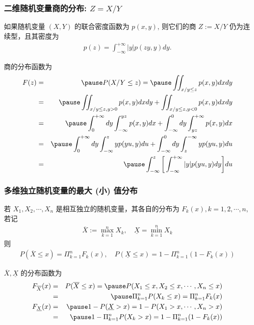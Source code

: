  \begin{frame}
 	\frametitle{二维随机变量商的分布: $Z=X/Y$}
 	\vspace{-0.3cm}
 	\begin{thm}[商的密度] 如果随机变量 $(X,Y)$ 的联合密度函数为 $p (x,y)$, 则它们的商 $Z:=X/Y$ 仍为连续型，且其密度为
 		\begin{eqnarray*}
 			p(z)=\int_{-\infty}^{+\infty} |y|p(zy,y)dy.
 		\end{eqnarray*}
 	\end{thm}
 	\pause \zheng 商的分布函数为
 	\vspace{-0.3cm}
 	\begin{eqnarray*}
 		F(z)&=&\pause P(X/Y\le z)=\pause \iint_{x/y\le z}p(x,y)dxdy\\
 		&=&\pause \iint_{x/y\le z, y>0}p(x,y)dxdy+\iint_{x/y\le z,y<0}p(x,y)dxdy\\
 		&=&\pause \int_0^{+\infty} dy\int_{-\infty}^{yz}p(x,y)dx+\int_{-\infty}^0dy\int_{yz}^{+\infty}p(x,y)dx\\
 		&=&\pause \int_0^{+\infty} dy\int_{-\infty}^{z}yp(yu,y)du+\int_{-\infty}^0dy\int_{z}^{-\infty}yp(yu,y)du\\
 		&=&\pause \int_{-\infty}^{z}\bigg[\int_{-\infty}^{+\infty}|y|p(yu,y)dy\bigg]du
 	\end{eqnarray*}

 \end{frame}
 \begin{frame}
 	\frametitle{多维独立随机变量的最大 (小) 值分布}
 	\begin{thm}
 		若 $X_1,X_2,\cdots,X_n$ 是相互独立的随机变量，其各自的分布为 $F_k (x), k=1,2,
 		\cdots, n$, 若记
 		\begin{eqnarray*}
 			\overline{X}:=\max_{k=1}^nX_k, \quad \underline{X}=\min_{k=1}^nX_k
 		\end{eqnarray*}
 		则
 		\begin{eqnarray*}
 			P(\overline{X}\le x)=\Pi_{k=1}^nF_k(x),\quad  P(\underline{X}\le x)=1-\Pi_{k=1}^n(1-F_k(x))
 		\end{eqnarray*}
 	\end{thm}
 	\pause \zheng $\overline{X},\underline{X}$ 的分布函数为
 	\begin{eqnarray*}
 		F_{\overline{X}}(x)&=&P(\overline{X}\le x)=\pause P(X_1\le x,X_2\le x,\cdots, X_n\le x)\\
 		&=&\pause  \Pi_{k=1}^nP(X_k\le x)=\Pi_{k=1}^nF_k(x)\\
 		F_{\underline{X}}(x)&=& \pause 1-P(\underline{X}>x)=1-P(X_1>x,\cdots, X_n>x)\\
 		&=&\pause 1-\Pi_{k=1}^nP(X_k>x)=1-\Pi_{k=1}^n(1-F_k(x))
 	\end{eqnarray*}

 \end{frame}

